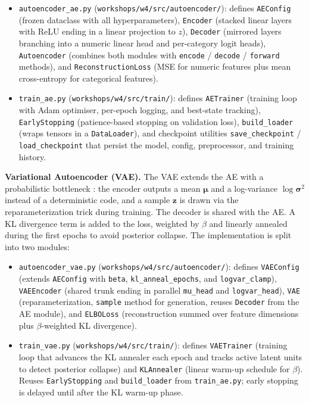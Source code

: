 \documentclass{article}
\begin{document}
\begin{itemize}

\item \texttt{autoencoder\_ae.py} (\texttt{workshops/w4/src/autoencoder/}):
defines \texttt{AEConfig} (frozen dataclass with all hyperparameters),
\texttt{Encoder} (stacked linear layers with ReLU ending in a linear projection
to $z$), \texttt{Decoder} (mirrored layers branching into a numeric linear head
and per-category logit heads), \texttt{Autoencoder} (combines both modules with
\texttt{encode} / \texttt{decode} / \texttt{forward} methods), and
\texttt{ReconstructionLoss} (MSE for numeric features plus mean cross-entropy
for categorical features).

\item \texttt{train\_ae.py} (\texttt{workshops/w4/src/train/}):
defines \texttt{AETrainer} (training loop with Adam optimiser, per-epoch logging,
and best-state tracking), \texttt{EarlyStopping} (patience-based stopping on
validation loss), \texttt{build\_loader} (wraps tensors in a \texttt{DataLoader}),
and checkpoint utilities \texttt{save\_checkpoint} / \texttt{load\_checkpoint}
that persist the model, config, preprocessor, and training history.

\end{itemize}

\textbf{Variational Autoencoder (VAE).} The VAE extends the AE with a
probabilistic bottleneck \cite{kingma2013auto}: the encoder outputs a mean $\boldsymbol{\mu}$ and a
log-variance $\log\boldsymbol{\sigma}^2$ instead of a deterministic code, and a
sample $\mathbf{z}$ is drawn via the reparameterization trick during training.
The decoder is shared with the AE. A KL divergence term is added to the loss,
weighted by $\beta$ and linearly annealed during the first epochs to avoid
posterior collapse. The implementation is split into two modules:

\begin{itemize}

\item \texttt{autoencoder\_vae.py} (\texttt{workshops/w4/src/autoencoder/}):
defines \texttt{VAEConfig} (extends \texttt{AEConfig} with \texttt{beta},
\texttt{kl\_anneal\_epochs}, and \texttt{logvar\_clamp}), \texttt{VAEEncoder}
(shared trunk ending in parallel \texttt{mu\_head} and \texttt{logvar\_head}),
\texttt{VAE} (reparameterization, \texttt{sample} method for generation, reuses
\texttt{Decoder} from the AE module), and \texttt{ELBOLoss}
(reconstruction summed over feature dimensions plus $\beta$-weighted KL divergence).

\item \texttt{train\_vae.py} (\texttt{workshops/w4/src/train/}):
defines \texttt{VAETrainer} (training loop that advances the KL annealer each
epoch and tracks active latent units to detect posterior collapse) and
\texttt{KLAnnealer} (linear warm-up schedule for $\beta$). Reuses
\texttt{EarlyStopping} and \texttt{build\_loader} from \texttt{train\_ae.py};
early stopping is delayed until after the KL warm-up phase.

\end{itemize}
\end{document}
